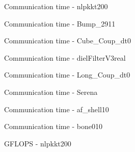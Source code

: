 \begin{figure}[H]
    \centering
    \caption{Communication time - nlpkkt200}
    \label{fig:nlpkkt200_tcomm_single_defq}
\end{figure}

\begin{figure}[H]
    \centering
    \caption{Communication time - Bump\_2911}
    \label{fig:Bump_2911_tcomm_single_defq}
\end{figure}

\begin{figure}[H]
    \centering
    \caption{Communication time - Cube\_Coup\_dt0}
    \label{fig:Cube_Coup_dt0_tcomm_single_defq}
\end{figure}

\begin{figure}[H]
    \centering
    \caption{Communication time - dielFilterV3real}
    \label{fig:dielFilterV3real_tcomm_single_defq}
\end{figure}

\begin{figure}[H]
    \centering
    \caption{Communication time - Long\_Coup\_dt0}
    \label{fig:Long_Coup_dt0_tcomm_single_defq}
\end{figure}

\begin{figure}[H]
    \centering
    \caption{Communication time - Serena}
    \label{fig:Serena_tcomm_single_defq}
\end{figure}

\begin{figure}[H]
    \centering
    \caption{Communication time - af\_shell10}
    \label{fig:af_shell10_tcomm_single_defq}
\end{figure}

\begin{figure}[H]
    \centering
    \caption{Communication time - bone010}
    \label{fig:bone010_tcomm_single_defq}
\end{figure}

\begin{figure}[H]
    \centering
    \caption{GFLOPS - nlpkkt200}
    \label{fig:nlpkkt200_gflops_single_defq}
\end{figure}

